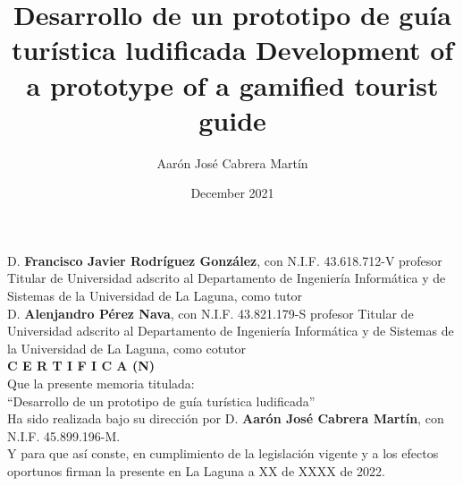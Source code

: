 \documentclass{report}
\title{Desarrollo de un prototipo de guía turística ludificada \linebreak Development of a prototype of a gamified tourist guide}
\author{Aarón José Cabrera Martín}
\date{December 2021}
\begin{document}
\maketitle
\newpage

D. \textbf{Francisco Javier Rodríguez González}, con N.I.F. 43.618.712-V profesor Titular de Universidad adscrito al Departamento de Ingeniería Informática y de Sistemas de la Universidad de La Laguna, como tutor\\

D. \textbf{Alenjandro Pérez Nava}, con N.I.F. 43.821.179-S profesor Titular de Universidad adscrito al Departamento de Ingeniería Informática y de Sistemas de la Universidad de La Laguna, como cotutor\\

\textbf{C E R T I F I C A (N)}\\

Que la presente memoria titulada:\\
“Desarrollo de un prototipo de guía turística ludificada”\\

Ha sido realizada bajo su dirección por D. \textbf{Aarón José Cabrera Martín}, con N.I.F. 45.899.196-M.\\

Y para que así conste, en cumplimiento de la legislación vigente y a los efectos oportunos firman la presente en La Laguna a XX de XXXX de 2022.\\
\end{document}
